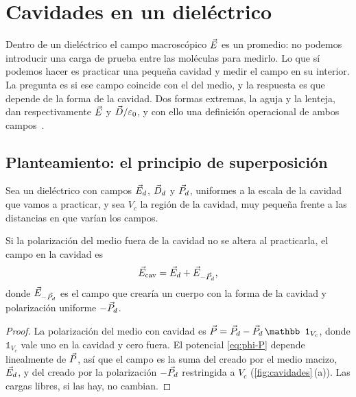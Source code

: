 \section{Cavidades en un dieléctrico}\label{sec:cavidades}

Dentro de un dieléctrico el campo macroscópico $\vec E$ es un promedio: no podemos introducir una carga de
prueba entre las moléculas para medirlo. Lo que sí podemos hacer es practicar una pequeña cavidad y medir
el campo en su interior. La pregunta es si ese campo coincide con el del medio, y la respuesta es que
depende de la forma de la cavidad. Dos formas extremas, la aguja y la lenteja, dan respectivamente $\vec E$ y
$\vec D/\varepsilon_0$, y con ello una definición operacional de ambos campos~\cite{DFA-teoria,Landau}.

\subsection{Planteamiento: el principio de superposición}\label{sec:cav-superposicion}

Sea un dieléctrico con campos $\vec E_d$, $\vec D_d$ y $\vec P_d$, uniformes a la escala de la cavidad que vamos a practicar, y sea
$V_c$ la región de la cavidad, muy pequeña frente a las distancias en que varían los campos.

\begin{proposicion}\label{prop:cav-superposicion}
Si la polarización del medio fuera de la cavidad no se altera al practicarla, el campo en la cavidad es
\begin{equation}\label{eq:cav-superposicion}
  \vec E_{\mathrm{cav}}=\vec E_d+\vec E_{-\vec P_d},
\end{equation}
donde $\vec E_{-\vec P_d}$ es el campo que crearía un cuerpo con la forma de la cavidad y polarización uniforme $-\vec P_d$.
\end{proposicion}

\begin{proof}
La polarización del medio con cavidad es $\vP=\vP_d-\vP_d\,\mathbb 1_{V_c}$, donde $\mathbb 1_{V_c}$ vale uno en la cavidad y cero fuera.
El potencial \eqref{eq:phi-P} depende linealmente de $\vec P$, así que el campo es la suma del creado por el medio macizo,
$\vec E_d$, y del creado por la polarización $-\vec P_d$ restringida a $V_c$ (\cref{fig:cavidades}\,(a)). Las cargas libres, si las hay,
no cambian.
\end{proof}

